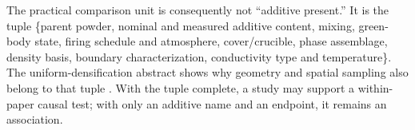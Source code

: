 The practical comparison unit is consequently not ``additive present.'' It is the tuple \{parent powder, nominal and measured additive content, mixing, green-body state, firing schedule and atmosphere, cover/crucible, phase assemblage, density basis, boundary characterization, conductivity type and temperature\}. The uniform-densification abstract shows why geometry and spatial sampling also belong to that tuple \cite{guo2023uniform}. With the tuple complete, a study may support a within-paper causal test; with only an additive name and an endpoint, it remains an association.
